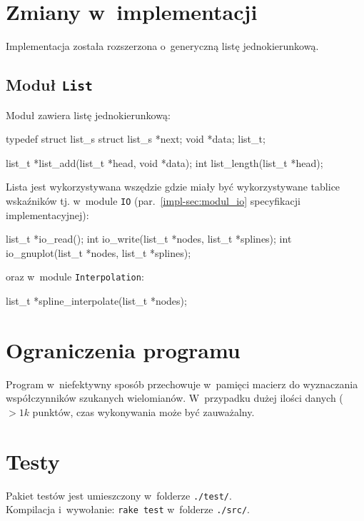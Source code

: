 \documentclass[10pt,a4paper]{article}
\begin{document}
\section{Zmiany w~implementacji}
Implementacja została rozszerzona o~generyczną listę jednokierunkową.

\subsection{Moduł {\tt List}}
Moduł zawiera listę jednokierunkową:
\begin{SmallVerbatim}
    typedef struct list_s {
      struct list_s *next;
      void *data;
    } list_t;

    list_t *list_add(list_t *head, void *data);
    int list_length(list_t *head);
\end{SmallVerbatim}

Lista jest wykorzystywana wszędzie gdzie miały być wykorzystywane tablice
wskaźników tj. w~module \texttt{IO} (par.~\ref{impl-sec:modul_io} specyfikacji
implementacyjnej):
\begin{SmallVerbatim}
    list_t *io_read();
    int io_write(list_t *nodes, list_t *splines);
    int io_gnuplot(list_t *nodes, list_t *splines);
\end{SmallVerbatim}
oraz w~module \texttt{Interpolation}:
\begin{SmallVerbatim}
    list_t *spline_interpolate(list_t *nodes);
\end{SmallVerbatim}

\section{Ograniczenia programu}
Program w~niefektywny sposób przechowuje w~pamięci macierz do wyznaczania
współczynników szukanych wielomianów. W~przypadku dużej ilości danych ($> 1k$
punktów, czas wykonywania może być zauważalny.

\section{Testy}
Pakiet testów jest umieszczony w~folderze {\tt ./test/}.\\
Kompilacja i~wywołanie: {\tt rake test} w~folderze {\tt ./src/}.
\end{document}
